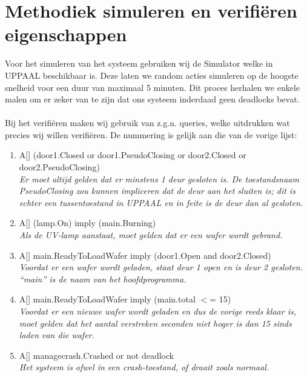 \documentclass[]{report}
\begin{document}
    \chapter{Methodiek simuleren en verifi\"eren eigenschappen}
        Voor het simuleren van het systeem gebruiken wij de Simulator welke in UPPAAL beschikbaar is. Deze
        laten we random acties simuleren op de hoogste snelheid voor een duur van maximaal 5 minuten. Dit
        proces herhalen we enkele malen om er zeker van te zijn dat ons systeem inderdaad geen deadlocks bevat.\\
        \\
        Bij het verifi\"eren maken wij gebruik van z.g.n. queries, welke uitdrukken wat precies wij willen
        verifi\"eren. De nummering is gelijk aan die van de vorige lijst:
        \begin{enumerate}
            \item A[] (door1.Closed or door1.PseudoClosing or door2.Closed or door2.PseudoClosing)\\
                \emph{    Er moet altijd gelden dat er minstens 1 deur gesloten is. De toestandsnaam PseudoClosing
                            zou kunnen impliceren dat de deur aan het sluiten is; dit is echter een tussentoestand
                            in UPPAAL en in feite is de deur dan al gesloten.}
            \item A[] (lamp.On) imply (main.Burning)\\
                \emph{    Als de UV-lamp aanstaat, moet gelden dat er een wafer wordt gebrand.}
            \item A[] main.ReadyToLoadWafer imply (door1.Open and door2.Closed)\\
                \emph{    Voordat er een wafer wordt geladen, staat deur 1 open en is deur 2 gesloten. ``main'' is de naam
                van het hoofdprogramma.}
            \item A[] main.ReadyToLoadWafer imply (main.total $<$= 15)\\
                \emph{    Voordat er een nieuwe wafer wordt geladen en dus de vorige reeds klaar is, moet
                            gelden dat het aantal verstreken seconden niet hoger is dan 15 sinds laden van
                            die wafer.}
            \item A[] managecrash.Crashed or not deadlock\\
                \emph{    Het systeem is ofwel in een crash-toestand, of draait zoals normaal.}
        \end{enumerate}
\end{document}
